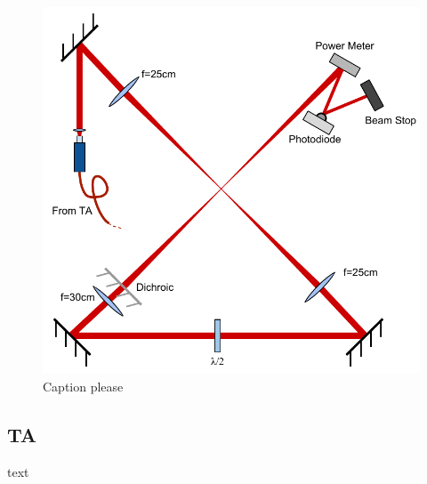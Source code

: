 \begin{figure}
\centering
\includegraphics{figs/DipoleTrapRig.pdf}
\caption{{\color{red} Caption please}}
\end{figure}

    \subsection{TA}
text

